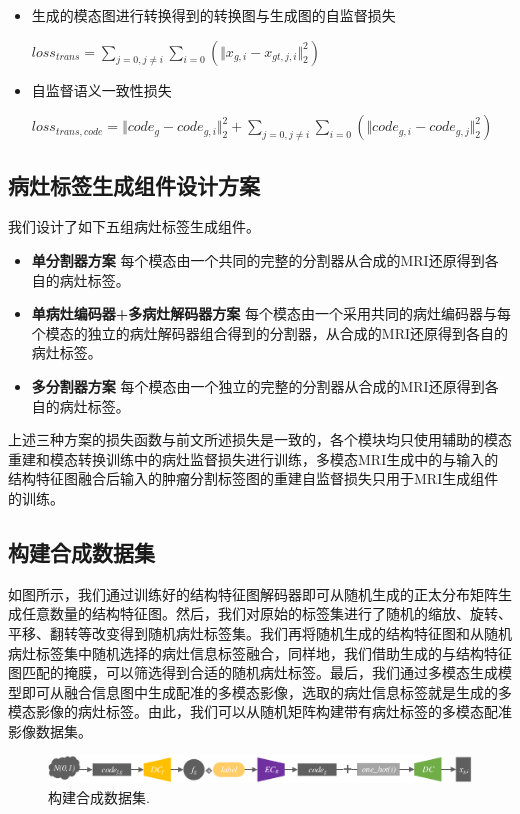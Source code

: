 \documentclass[letterpaper]{article} %
\begin{document}
\begin{itemize}
	\item 生成的模态图进行转换得到的转换图与生成图的自监督损失

\begin{center}
	$loss_{trans}=\sum\limits_{j=0,j\neq i}\sum\limits_{i=0}(\Vert{x_{g,i}-x_{gt,j,i}}\Vert_{2}^{2})$
\end{center}

	\item 自监督语义一致性损失
	
\begin{center}
	$loss_{trans,code}=\Vert{code_g-code_{g,i}}\Vert_{2}^{2}+\sum\limits_{j=0,j\neq i}\sum\limits_{i=0}(\Vert{code_{g,i}-code_{g,j}}\Vert_{2}^{2})$
\end{center}

\end{itemize}

\subsection{病灶标签生成组件设计方案}

我们设计了如下五组病灶标签生成组件。
\begin{itemize}
	\item \textbf{单分割器方案} 
	每个模态由一个共同的完整的分割器从合成的MRI还原得到各自的病灶标签。
	\item \textbf{单病灶编码器+多病灶解码器方案} 
	每个模态由一个采用共同的病灶编码器与每个模态的独立的病灶解码器组合得到的分割器，从合成的MRI还原得到各自的病灶标签。
	\item \textbf{多分割器方案} 
	每个模态由一个独立的完整的分割器从合成的MRI还原得到各自的病灶标签。
\end{itemize}
上述三种方案的损失函数与前文所述损失是一致的，各个模块均只使用辅助的模态重建和模态转换训练中的病灶监督损失进行训练，多模态MRI生成中的与输入的结构特征图融合后输入的肿瘤分割标签图的重建自监督损失只用于MRI生成组件的训练。

\subsection{构建合成数据集}
\label{make dataset}

如图所示，我们通过训练好的结构特征图解码器即可从随机生成的正太分布矩阵生成任意数量的结构特征图。然后，我们对原始的标签集进行了随机的缩放、旋转、平移、翻转等改变得到随机病灶标签集。我们再将随机生成的结构特征图和从随机病灶标签集中随机选择的病灶信息标签融合，同样地，我们借助生成的与结构特征图匹配的掩膜，可以筛选得到合适的随机病灶标签。最后，我们通过多模态生成模型即可从融合信息图中生成配准的多模态影像，选取的病灶信息标签就是生成的多模态影像的病灶标签。由此，我们可以从随机矩阵构建带有病灶标签的多模态配准影像数据集。
\begin{figure}
	\centering
	\includegraphics[width=0.98\linewidth]{figures/make_data}
	\caption{构建合成数据集.}
	\label{make_data}
\end{figure}
\end{document}
